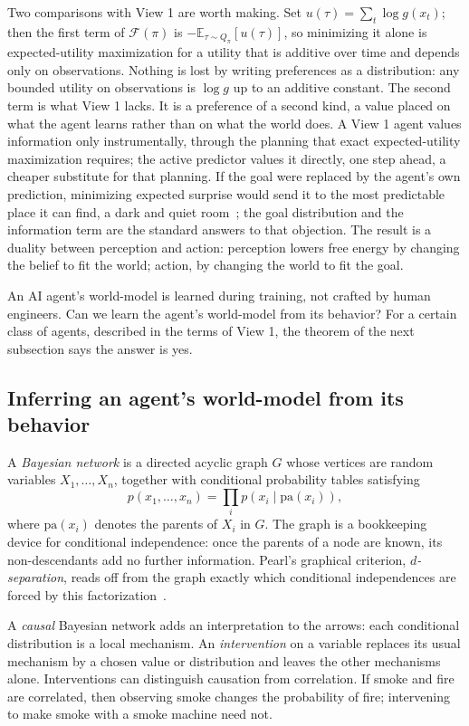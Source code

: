 Two comparisons with View 1 are worth making. Set $u(\tau)=\sum_t\log g(x_t)$; then the first term of $\mathcal F(\pi)$ is $-\mathbb{E}_{\tau\sim Q_\pi}[u(\tau)]$, so minimizing it alone is expected-utility maximization for a utility that is additive over time and depends only on observations. Nothing is lost by writing preferences as a distribution: any bounded utility on observations is $\log g$ up to an additive constant. The second term is what View 1 lacks. It is a preference of a second kind, a value placed on what the agent learns rather than on what the world does. A View 1 agent values information only instrumentally, through the planning that exact expected-utility maximization requires; the active predictor values it directly, one step ahead, a cheaper substitute for that planning. If the goal were replaced by the agent's own prediction, minimizing expected surprise would send it to the most predictable place it can find, a dark and quiet room~\cite{friston2015,millidge2021}; the goal distribution and the information term are the standard answers to that objection. The result is a duality between perception and action: perception lowers free energy by changing the belief to fit the world; action, by changing the world to fit the goal.

An AI agent's world-model is learned during training, not crafted by human engineers. Can we learn the agent's world-model from its behavior? For a certain class of agents, described in the terms of View 1, the theorem of the next subsection says the answer is yes.

\subsection{Inferring an agent's world-model from its behavior}

A \emph{Bayesian network} is a directed acyclic graph $G$ whose vertices are random variables $X_1,\dots,X_n$, together with conditional probability tables satisfying
\[
   p(x_1,\dots,x_n)=\prod_i p\!\left(x_i\mid \mathrm{pa}(x_i)\right),
\]
where $\mathrm{pa}(x_i)$ denotes the parents of $X_i$ in $G$. The graph is a bookkeeping device for conditional independence: once the parents of a node are known, its non-descendants add no further information. Pearl's graphical criterion, \emph{$d$-separation}, reads off from the graph exactly which conditional independences are forced by this factorization~\cite{pearl2009}.

A \emph{causal} Bayesian network adds an interpretation to the arrows: each conditional distribution is a local mechanism. An \emph{intervention} on a variable replaces its usual mechanism by a chosen value or distribution and leaves the other mechanisms alone. Interventions can distinguish causation from correlation. If smoke and fire are correlated, then observing smoke changes the probability of fire; intervening to make smoke with a smoke machine need not.

